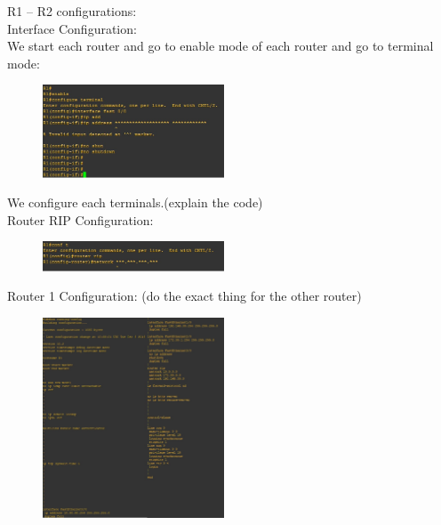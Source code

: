 \documentclass{article}
\begin{document}
R1 – R2 configurations:\\
Interface Configuration:\\
We start each router and go to enable mode of each router and go to terminal mode:

\begin{figure}[H]
	\begin{center}
		\includegraphics[width=0.48\textwidth]{Terminalconf.jpg}
	\end{center}
	\caption{\small  \newline}
	\label{fig:Prd}
\end{figure}

We configure each terminals.(explain the code)\\

Router RIP Configuration:

\begin{figure}[H]
	\begin{center}
		\includegraphics[width=0.48\textwidth]{RouterRip.jpg}
	\end{center}
	\caption{\small  \newline}
	\label{fig:Prd}
\end{figure}

Router 1 Configuration: (do the exact thing for the other router)

\begin{figure}[H]
	\begin{center}
		\includegraphics[width=0.48\textwidth]{Routerconfig.jpg}
	\end{center}
	\caption{\small  \newline}
	\label{fig:Prd}
\end{figure}
\end{document}
